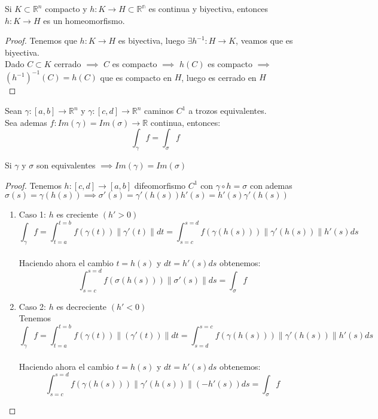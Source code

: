     \begin{observación}
    Si $K\subset \mathbb{R}^n$ compacto y $h:K \to H\subset \mathbb{R^n}$ es continua y biyectiva, entonces $h:K \to H$ es un homeomorfismo.
    \end{observación}

    \begin{proof}
        Tenemos que $h:K \to H$ es biyectiva, luego $\exists h^{-1}:H \to K$, veamos que es biyectiva. \\
        Dado $C \subset K$ cerrado $\implies$ $C$ es compacto $\implies$ $h(C)$ es compacto $\implies$ $(h^{-1})^{-1}(C)=h(C)$ que es compacto en $H$, luego es cerrado en $H$ \\
    \end{proof}

    \begin{teorema}
        Sean $\gamma: [a,b] \to \mathbb{R}^n$ y $\gamma:[c,d] \to \mathbb{R}^n$ caminos $C^1$ a trozos equivalentes. \\
        Sea ademas $f:Im(\gamma)=Im(\sigma) \to \mathbb{R}$ continua, entonces: \\
        $$\int_{\gamma}f=\int_{\sigma}f$$
    \end{teorema}

    \begin{observación}
    Si $\gamma$ y $\sigma$ son equivalentes $\implies Im(\gamma)=Im(\sigma)$
    \end{observación}

    \begin{proof}
        Tenemos $h:[c,d] \to [a,b]$ difeomorfismo $C^1$ con $\gamma \circ h = \sigma$ con ademas $\sigma(s) = \gamma(h(s)) \implies \sigma'(s) = \gamma'(h(s))h'(s)=h'(s)\gamma'(h(s))$ \\
        \begin{enumerate}
            \item Caso 1: $h$ es creciente $(h'>0)$ \\ $$\int_{\gamma} f = \int_{t=a}^{t=b}
                      f(\gamma(t)) \lVert \gamma'(t) \rVert dt = \int_{s=c}^{s=d} f(\gamma(h(s)))
                      \lVert \gamma'(h(s)) \rVert h'(s)ds$$ \\ Haciendo ahora el cambio $t=h(s)$ y
                  $dt=h'(s)ds$ obtenemos: $$\int_{s=c}^{s=d} f(\sigma(h(s))) \lVert \sigma'(s)
                      \rVert ds=\int_{\sigma}f$$
            \item Caso 2: $h$ es decreciente $(h'<0)$\\ Tenemos $$ \int_{\gamma} f=
                      \int_{t=a}^{t=b} f(\gamma(t)) \lVert (\gamma'(t)) \rVert
                      dt=\int_{s=d}^{s=c}f(\gamma(h(s))) \lVert \gamma'(h(s)) \rVert h'(s)ds$$ \\
                  Haciendo ahora el cambio $t=h(s)$ y $dt=h'(s)ds$ obtenemos: $$\int_{s=c}^{s=d}
                      f(\gamma(h(s))) \lVert \gamma'(h(s)) \rVert (-h'(s))ds = \int_{\sigma}f$$
        \end{enumerate}
    \end{proof}

